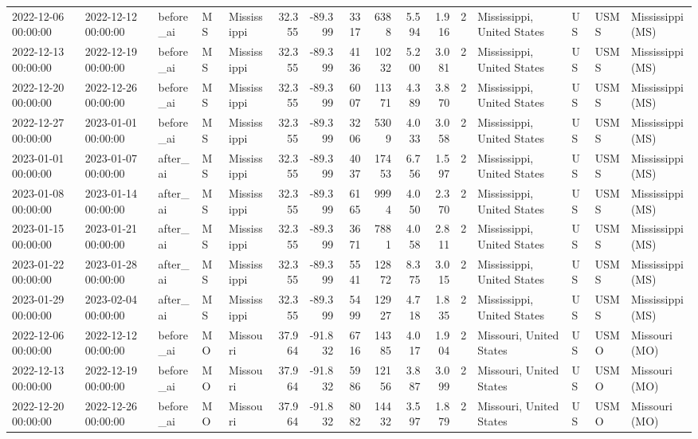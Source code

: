 \begin{tabular}{lllllrrrrrrlllll}
2022-12-06 00:00:00 & 2022-12-12 00:00:00 & before\_ai & MS & Mississippi & 32.355 & -89.399 & 3317 & 6388 & 5.594 & 1.916 & 2 & Mississippi, United States & US & USMS & Mississippi (MS) \\
2022-12-13 00:00:00 & 2022-12-19 00:00:00 & before\_ai & MS & Mississippi & 32.355 & -89.399 & 4136 & 10232 & 5.200 & 3.081 & 2 & Mississippi, United States & US & USMS & Mississippi (MS) \\
2022-12-20 00:00:00 & 2022-12-26 00:00:00 & before\_ai & MS & Mississippi & 32.355 & -89.399 & 6007 & 11371 & 4.389 & 3.870 & 2 & Mississippi, United States & US & USMS & Mississippi (MS) \\
2022-12-27 00:00:00 & 2023-01-01 00:00:00 & before\_ai & MS & Mississippi & 32.355 & -89.399 & 3206 & 5309 & 4.033 & 3.058 & 2 & Mississippi, United States & US & USMS & Mississippi (MS) \\
2023-01-01 00:00:00 & 2023-01-07 00:00:00 & after\_ai & MS & Mississippi & 32.355 & -89.399 & 4037 & 17453 & 6.756 & 1.597 & 2 & Mississippi, United States & US & USMS & Mississippi (MS) \\
2023-01-08 00:00:00 & 2023-01-14 00:00:00 & after\_ai & MS & Mississippi & 32.355 & -89.399 & 6165 & 9994 & 4.050 & 2.370 & 2 & Mississippi, United States & US & USMS & Mississippi (MS) \\
2023-01-15 00:00:00 & 2023-01-21 00:00:00 & after\_ai & MS & Mississippi & 32.355 & -89.399 & 3671 & 7881 & 4.058 & 2.811 & 2 & Mississippi, United States & US & USMS & Mississippi (MS) \\
2023-01-22 00:00:00 & 2023-01-28 00:00:00 & after\_ai & MS & Mississippi & 32.355 & -89.399 & 5541 & 12872 & 8.375 & 3.015 & 2 & Mississippi, United States & US & USMS & Mississippi (MS) \\
2023-01-29 00:00:00 & 2023-02-04 00:00:00 & after\_ai & MS & Mississippi & 32.355 & -89.399 & 5499 & 12927 & 4.718 & 1.835 & 2 & Mississippi, United States & US & USMS & Mississippi (MS) \\
2022-12-06 00:00:00 & 2022-12-12 00:00:00 & before\_ai & MO & Missouri & 37.964 & -91.832 & 6716 & 14385 & 4.017 & 1.904 & 2 & Missouri, United States & US & USMO & Missouri (MO) \\
2022-12-13 00:00:00 & 2022-12-19 00:00:00 & before\_ai & MO & Missouri & 37.964 & -91.832 & 5986 & 12156 & 3.887 & 3.099 & 2 & Missouri, United States & US & USMO & Missouri (MO) \\
2022-12-20 00:00:00 & 2022-12-26 00:00:00 & before\_ai & MO & Missouri & 37.964 & -91.832 & 8082 & 14432 & 3.597 & 1.879 & 2 & Missouri, United States & US & USMO & Missouri (MO) \\

\end{tabular}

